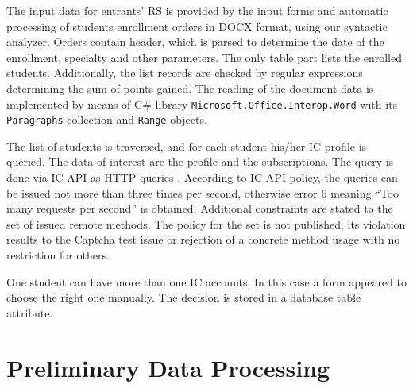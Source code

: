\documentclass[conference,a4]{IEEEtran}
\begin{document}
The input data for entrants' RS is provided by the input forms and automatic processing of students enrollment orders in DOCX format, using our syntactic analyzer.  Orders contain header, which is parsed to determine the date of the enrollment, specialty and other parameters.  The only table part lists the enrolled students.  Additionally, the list records are checked by regular expressions determining the sum of points gained.  The reading of the document data is implemented by means of C\# library \texttt{Microsoft.Office.Interop.Word} with its \texttt{Paragraphs} collection and \texttt{Range} objects.

The list of students is traversed, and for each student his/her IC profile is queried.  The data of interest are the profile and the subscriptions.  The query is done via IC API as HTTP queries \cite{apivk}.  According to IC API policy, the queries can be issued not more than three times per second, otherwise error 6 meaning ``Too many requests per second'' is obtained.  Additional constraints are stated to the set of issued remote methods.  The policy for the set is not published, its violation results to the Captcha test issue or rejection of a concrete method usage with no restriction for others.


One student can have more than one IC accounts.  In this case a form appeared to choose the right one manually.  The decision is stored in a database table attribute.


\section{Preliminary Data Processing}
\label{sec:relim-proc}



\end{document}
